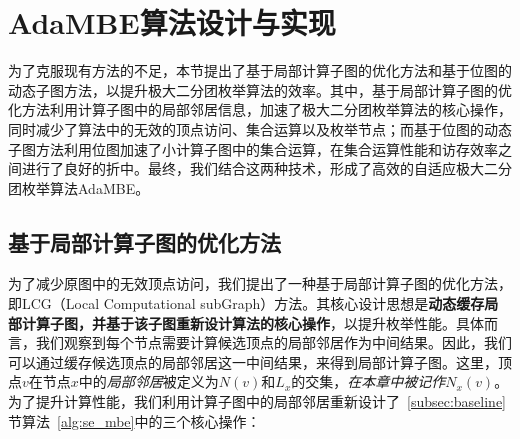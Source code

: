 



  

\section{AdaMBE算法设计与实现}

为了克服现有方法的不足，本节提出了基于局部计算子图的优化方法和基于位图的动态子图方法，以提升极大二分团枚举算法的效率。其中，基于局部计算子图的优化方法利用计算子图中的局部邻居信息，加速了极大二分团枚举算法的核心操作，同时减少了算法中的无效的顶点访问、集合运算以及枚举节点；而基于位图的动态子图方法利用位图加速了小计算子图中的集合运算，在集合运算性能和访存效率之间进行了良好的折中。最终，我们结合这两种技术，形成了高效的自适应极大二分团枚举算法AdaMBE。

\subsection{基于局部计算子图的优化方法}
\label{subsec:ada_design_2}

为了减少原图中的无效顶点访问，我们提出了一种基于局部计算子图的优化方法，即LCG（Local Computational subGraph）方法。其核心设计思想是\textbf{动态缓存局部计算子图，并基于该子图重新设计算法的核心操作}，以提升枚举性能。具体而言，我们观察到每个节点需要计算候选顶点的局部邻居作为中间结果。因此，我们可以通过缓存候选顶点的局部邻居这一中间结果，来得到局部计算子图。这里，顶点$v$在节点$x$中的\emph{局部邻居}被定义为$N(v)$和$L_x$的交集，\emph{在本章中被记作$N_x(v)$}。为了提升计算性能，我们利用计算子图中的局部邻居重新设计了~\ref{subsec:baseline}节算法~\ref{alg:se_mbe}中的三个核心操作：

